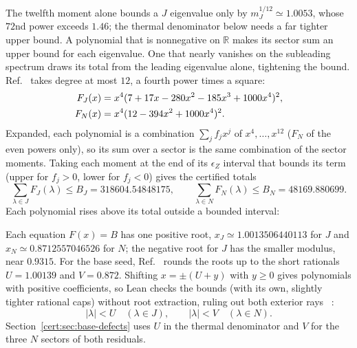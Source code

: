 The twelfth moment alone bounds a $J$ eigenvalue only by
$m_J^{1/12}\simeq1.0053$, whose $72$nd power exceeds $1.46$; the thermal
denominator below needs a far tighter upper bound. A polynomial that is
nonnegative on $\mathbb R$ makes its sector sum an upper bound for each
eigenvalue. One that nearly vanishes on the subleading spectrum draws
its total from the leading eigenvalue alone, tightening the bound.
Ref.~\cite{OpenAI2026Periodic} takes degree at most $12$, a fourth power
times a square:
\begin{align}
    F_J(x) &=x^4(7+17x-280x^2-185x^3+1000x^4)^2,\notag\\
    F_N(x) &=x^4(12-394x^2+1000x^4)^2.
    \label{cert:eq:filters}
\end{align}
Expanded, each polynomial is a combination $\sum_jf_jx^j$ of
$x^4,\ldots,x^{12}$ ($F_N$ of the even powers only), so its sum over a
sector is the same combination of the sector moments. Taking each moment
at the end of its $\epsilon_Z$ interval that bounds its term (upper for
$f_j>0$, lower for $f_j<0$) gives the certified totals
\begin{equation}
    \sum_{\lambda\in J}F_J(\lambda)\le B_J=318604.54848175,\qquad
    \sum_{\lambda\in N}F_N(\lambda)\le B_N=48169.880699.
    \label{cert:eq:filter-bounds}
\end{equation}
Each polynomial rises above its total outside a bounded interval:
\begin{proofdiagram}
    \filterpair
\end{proofdiagram}
Each equation $F(x)=B$ has one positive root, $x_J\simeq1.0013506440113$
for $J$ and $x_N\simeq0.8712557046526$ for $N$; the negative root for $J$
has the smaller modulus, near $0.9315$. For the base seed,
Ref.~\cite{OpenAI2026Periodic} rounds the roots up to the short rationals
$U=1.00139$ and $V=0.872$. Shifting $x=\pm(U+y)$ with $y\ge0$ gives
polynomials with positive coefficients, so Lean checks the bounds (with its own,
slightly tighter rational caps) without root extraction, ruling out both
exterior rays%
~:
\begin{equation}
    |\lambda|<U\quad(\lambda\in J),\qquad
    |\lambda|<V\quad(\lambda\in N).
    \label{cert:eq:caps}
\end{equation}
Section~\ref{cert:sec:base-defects} uses $U$ in the thermal denominator
and $V$ for the three $N$ sectors of both residuals.

